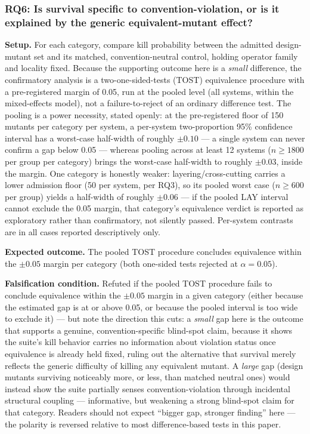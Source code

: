 \documentclass[11pt]{article}
\begin{document}
\subsubsection{RQ6: Is survival specific to convention-violation, or is it explained by the generic equivalent-mutant effect?}
\textbf{Setup.} For each category, compare kill probability between the admitted design-mutant set and its matched, convention-neutral control, holding operator family and locality fixed. Because the supporting outcome here is a \emph{small} difference, the confirmatory analysis is a two-one-sided-tests (TOST) equivalence procedure with a pre-registered margin of 0.05, run at the pooled level (all systems, within the mixed-effects model), not a failure-to-reject of an ordinary difference test. The pooling is a power necessity, stated openly: at the pre-registered floor of 150 mutants per category per system, a per-system two-proportion 95\% confidence interval has a worst-case half-width of roughly $\pm 0.10$ --- a single system can never confirm a gap below 0.05 --- whereas pooling across at least 12 systems ($n \geq 1800$ per group per category) brings the worst-case half-width to roughly $\pm 0.03$, inside the margin. One category is honestly weaker: layering/cross-cutting carries a lower admission floor (50 per system, per RQ3), so its pooled worst case ($n \geq 600$ per group) yields a half-width of roughly $\pm 0.06$ --- if the pooled LAY interval cannot exclude the 0.05 margin, that category's equivalence verdict is reported as exploratory rather than confirmatory, not silently passed. Per-system contrasts are in all cases reported descriptively only.

\textbf{Expected outcome.} The pooled TOST procedure concludes equivalence within the $\pm 0.05$ margin per category (both one-sided tests rejected at $\alpha = 0.05$).

\textbf{Falsification condition.} Refuted if the pooled TOST procedure fails to conclude equivalence within the $\pm 0.05$ margin in a given category (either because the estimated gap is at or above 0.05, or because the pooled interval is too wide to exclude it) --- but note the direction this cuts: a \emph{small} gap here is the outcome that supports a genuine, convention-specific blind-spot claim, because it shows the suite's kill behavior carries no information about violation status once equivalence is already held fixed, ruling out the alternative that survival merely reflects the generic difficulty of killing any equivalent mutant. A \emph{large} gap (design mutants surviving noticeably more, or less, than matched neutral ones) would instead show the suite partially senses convention-violation through incidental structural coupling --- informative, but weakening a strong blind-spot claim for that category. Readers should not expect ``bigger gap, stronger finding'' here --- the polarity is reversed relative to most difference-based tests in this paper.
\end{document}

